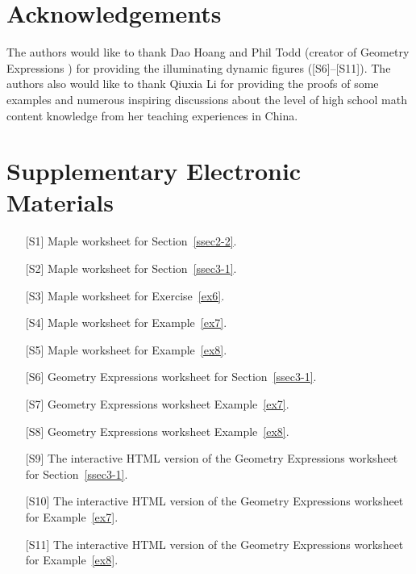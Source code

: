 \documentclass[12pt,a4paper]{article}%
\begin{document}
\section{Acknowledgements} \label{ack}

The authors would like to thank Dao Hoang and Phil Todd
(creator of Geometry Expressions \cite{GE})
for providing the illuminating dynamic figures 
([S6]--[S11]). The authors also would like to thank Qiuxia Li for providing the
proofs of some examples and numerous inspiring discussions about the level of
high school math content knowledge from her teaching experiences in China.

\section{Supplementary Electronic Materials}

\begin{enumerate}
\item[{[S1]}] Maple worksheet for Section~\ref{ssec2-2}.
\item[{[S2]}] Maple worksheet for Section~\ref{ssec3-1}.
\item[{[S3]}] Maple worksheet for Exercise~\ref{ex6}.
\item[{[S4]}] Maple worksheet for Example~\ref{ex7}.
\item[{[S5]}] Maple worksheet for Example~\ref{ex8}.
\item[{[S6]}] Geometry Expressions worksheet for Section~\ref{ssec3-1}.
\item[{[S7]}] Geometry Expressions worksheet Example~\ref{ex7}.
\item[{[S8]}] Geometry Expressions worksheet Example~\ref{ex8}.
\item[{[S9]}] The interactive HTML version of the Geometry Expressions worksheet for Section~\ref{ssec3-1}.
\item[{[S10]}] The interactive HTML version of the Geometry Expressions worksheet for Example~\ref{ex7}.
\item[{[S11]}] The interactive HTML version of the Geometry Expressions worksheet for Example~\ref{ex8}.
\end{enumerate}
\end{document}
